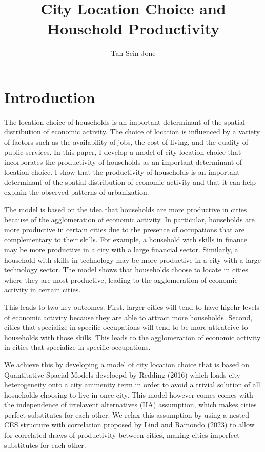 \documentclass[10pt]{article}
\title{City Location Choice and Household Productivity}
\author{Tan Sein Jone}
\date{}
\begin{document}
\doublespacing
\maketitle

\section{Introduction}

The location choice of households is an important determinant of the spatial distribution of economic activity. The choice of location is influenced by a variety of factors such as the availability of jobs, the cost of living, and the quality of public services. In this paper, I develop a model of city location choice that incorporates the productivity of households as an important determinant of location choice. I show that the productivity of households is an important determinant of the spatial distribution of economic activity and that it can help explain the observed patterns of urbanization.

The model is based on the idea that households are more productive in cities because of the agglomeration of economic activity. In particular, households are more productive in certain cities due to the presence of occupations that are complementary to their skills. For example, a household with skills in finance may be more productive in a city with a large financial sector. Similarly, a household with skills in technology may be more productive in a city with a large technology sector. The model shows that households choose to locate in cities where they are most productive, leading to the agglomeration of economic activity in certain cities.

This leads to two key outcomes. First, larger cities will tend to have higehr levels of economic activity because they are able to attract more households. Second, cities that specialize in specific occupations will tend to be more attratcive to households with those skills. This leads to the agglomeration of economic activity in cities that specialize in specific occupations.

We achieve this by developing a model of city location choice that is based on Quantitative Spacial Models develoepd by Redding (2016) which loads city heterogeneity onto a city ammenity term in order to avoid a trivial solution of all hosueholds choosing to live in once city. This model however comes comes with the independence of irrelavent alternatives (IIA) assumption, which makes cities perfect substitutes for each other. We relax this assumption by using a nested CES structure with correlation proposed by Lind and Ramondo (2023) to allow for correlated draws of productivity between cities, making cities imperfect substitutes for each other.
\end{document}
